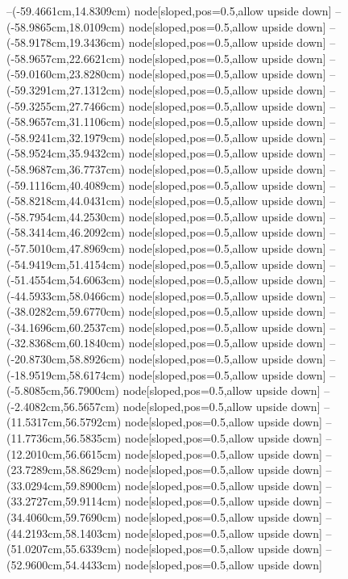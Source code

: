 --(-59.4661cm,14.8309cm) node[sloped,pos=0.5,allow upside down]{\arrowIn}
--(-58.9865cm,18.0109cm) node[sloped,pos=0.5,allow upside down]{\ArrowIn}
--(-58.9178cm,19.3436cm) node[sloped,pos=0.5,allow upside down]{\ArrowIn}
--(-58.9657cm,22.6621cm) node[sloped,pos=0.5,allow upside down]{\ArrowIn}
--(-59.0160cm,23.8280cm) node[sloped,pos=0.5,allow upside down]{\ArrowIn}
--(-59.3291cm,27.1312cm) node[sloped,pos=0.5,allow upside down]{\ArrowIn}
--(-59.3255cm,27.7466cm) node[sloped,pos=0.5,allow upside down]{\arrowIn}
--(-58.9657cm,31.1106cm) node[sloped,pos=0.5,allow upside down]{\ArrowIn}
--(-58.9241cm,32.1979cm) node[sloped,pos=0.5,allow upside down]{\ArrowIn}
--(-58.9524cm,35.9432cm) node[sloped,pos=0.5,allow upside down]{\ArrowIn}
--(-58.9687cm,36.7737cm) node[sloped,pos=0.5,allow upside down]{\arrowIn}
--(-59.1116cm,40.4089cm) node[sloped,pos=0.5,allow upside down]{\ArrowIn}
--(-58.8218cm,44.0431cm) node[sloped,pos=0.5,allow upside down]{\ArrowIn}
--(-58.7954cm,44.2530cm) node[sloped,pos=0.5,allow upside down]{\arrowIn}
--(-58.3414cm,46.2092cm) node[sloped,pos=0.5,allow upside down]{\ArrowIn}
--(-57.5010cm,47.8969cm) node[sloped,pos=0.5,allow upside down]{\ArrowIn}
--(-54.9419cm,51.4154cm) node[sloped,pos=0.5,allow upside down]{\ArrowIn}
--(-51.4554cm,54.6063cm) node[sloped,pos=0.5,allow upside down]{\ArrowIn}
--(-44.5933cm,58.0466cm) node[sloped,pos=0.5,allow upside down]{\ArrowIn}
--(-38.0282cm,59.6770cm) node[sloped,pos=0.5,allow upside down]{\ArrowIn}
--(-34.1696cm,60.2537cm) node[sloped,pos=0.5,allow upside down]{\ArrowIn}
--(-32.8368cm,60.1840cm) node[sloped,pos=0.5,allow upside down]{\ArrowIn}
--(-20.8730cm,58.8926cm) node[sloped,pos=0.5,allow upside down]{\ArrowIn}
--(-18.9519cm,58.6174cm) node[sloped,pos=0.5,allow upside down]{\ArrowIn}
--(-5.8085cm,56.7900cm) node[sloped,pos=0.5,allow upside down]{\ArrowIn}
--(-2.4082cm,56.5657cm) node[sloped,pos=0.5,allow upside down]{\ArrowIn}
--(11.5317cm,56.5792cm) node[sloped,pos=0.5,allow upside down]{\ArrowIn}
--(11.7736cm,56.5835cm) node[sloped,pos=0.5,allow upside down]{\arrowIn}
--(12.2010cm,56.6615cm) node[sloped,pos=0.5,allow upside down]{\arrowIn}
--(23.7289cm,58.8629cm) node[sloped,pos=0.5,allow upside down]{\ArrowIn}
--(33.0294cm,59.8900cm) node[sloped,pos=0.5,allow upside down]{\ArrowIn}
--(33.2727cm,59.9114cm) node[sloped,pos=0.5,allow upside down]{\arrowIn}
--(34.4060cm,59.7690cm) node[sloped,pos=0.5,allow upside down]{\ArrowIn}
--(44.2193cm,58.1403cm) node[sloped,pos=0.5,allow upside down]{\ArrowIn}
--(51.0207cm,55.6339cm) node[sloped,pos=0.5,allow upside down]{\ArrowIn}
--(52.9600cm,54.4433cm) node[sloped,pos=0.5,allow upside down]{\ArrowIn}
